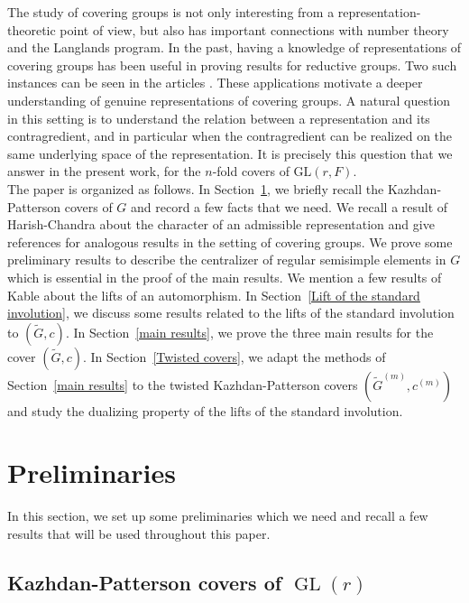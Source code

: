 \documentclass[11pt, a4paper, reqno]{amsart}
\theoremstyle{definition}
\theoremstyle{remark}
\theoremstyle{example}
\theoremstyle{note}
\numberwithin{equation}{section}
\DeclareMathOperator{\GL}{GL}
\begin{document}
The study of covering groups is not only interesting from a
representation-theoretic point of view, but also has important connections
with number theory and the Langlands program. In the past, having a knowledge of representations of covering groups has been useful in proving results for reductive groups. Two such instances can be seen in the articles \cite{Shuichiro2014, Shuichiro2015}. These
applications motivate a deeper understanding of genuine representations of
covering groups.  A natural question in this setting is to understand the relation
between a representation and its contragredient, and in particular when the
contragredient can be realized on the same underlying space of the representation.
It is precisely this question that we answer in the present work, for the $n$-fold covers of $\mathrm{GL}(r,F)$.\\

The paper is organized as follows. In Section~\ref{preliminaries}, we briefly recall the Kazhdan-Patterson covers of $G$ and record a few facts that we need. We recall a result of Harish-Chandra about the character of an admissible representation and give references for analogous results in the setting of covering groups. We prove some preliminary results to describe the centralizer of regular semisimple elements in $G$ which is essential in the proof of the main results. We mention a few results of Kable about the lifts of an automorphism. In Section~\ref{Lift of the standard involution}, we discuss some results related to the lifts of the standard involution to $(\widetilde{G}, c)$. In Section~\ref{main results}, we prove the three main results for the cover $(\widetilde{G},c)$. In  Section~\ref{Twisted covers}, we adapt the methods of Section~\ref{main results} to the twisted Kazhdan-Patterson covers $(\widetilde{G}^{(m)}, c^{(m)})$ and study the dualizing property of the lifts of the standard involution. 


\section{Preliminaries}\label{preliminaries}

In this section, we set up some preliminaries which we need and recall a few results that will be used throughout this paper. 






\subsection{Kazhdan-Patterson covers of $\GL(r)$}\label{Kazhdan-Patterson covers of GL(r)}
\end{document}
